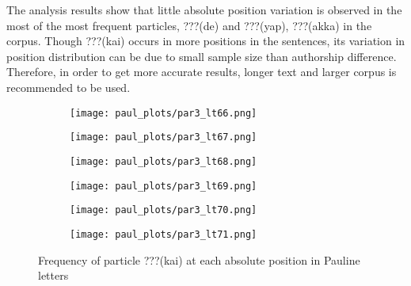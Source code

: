\documentclass[a4paper]{article}
\begin{document}
The analysis results show that little absolute position variation is observed in the most of the most frequent particles, ???(de) and ???(yap), ???(akka) in the corpus. Though ???(kai) occurs in more positions in the sentences, its variation in position distribution can be due to small sample size than authorship difference. Therefore, in order to get more accurate results, longer text and larger corpus is recommended to be used. 

\begin{figure}
\begin{subfigure}{0.45\textwidth}
\centering
\texttt{[image: paul\_plots/par3\_lt66.png]}
\end{subfigure}
\begin{subfigure}{0.45\textwidth}
\centering
\texttt{[image: paul\_plots/par3\_lt67.png]}
\end{subfigure}
\begin{subfigure}{0.45\textwidth}
\centering
\texttt{[image: paul\_plots/par3\_lt68.png]}
\end{subfigure}
\begin{subfigure}{0.45\textwidth}
\centering
\texttt{[image: paul\_plots/par3\_lt69.png]}
\end{subfigure}
\begin{subfigure}{0.45\textwidth}
\centering
\texttt{[image: paul\_plots/par3\_lt70.png]}
\end{subfigure}
\begin{subfigure}{0.45\textwidth}
\centering
\texttt{[image: paul\_plots/par3\_lt71.png]}
\end{subfigure}
\caption{Frequency of particle ???(kai) at each absolute position in Pauline letters}
\label{paul_kai}
\end{figure}
\end{document}
